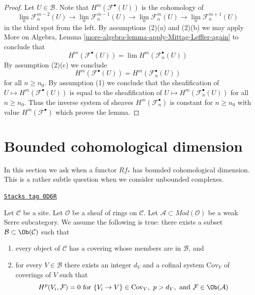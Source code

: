 \begin{proof}
Let $U \in \mathcal{B}$. Note that
$H^m(\mathcal{F}^\bullet(U))$ is the cohomology of
$$
\lim_n \mathcal{F}_n^{m - 2}(U) \to
\lim_n \mathcal{F}_n^{m - 1}(U) \to
\lim_n \mathcal{F}_n^m(U) \to
\lim_n \mathcal{F}_n^{m + 1}(U)
$$
in the third spot from the left. By assumptions (2)(a) and (2)(b)
we may apply
More on Algebra, Lemma \ref{more-algebra-lemma-apply-Mittag-Leffler-again}
to conclude that
$$
H^m(\mathcal{F}^\bullet(U)) = \lim H^m(\mathcal{F}_n^\bullet(U))
$$
By assumption (2)(c) we conclude
$$
H^m(\mathcal{F}^\bullet(U)) = H^m(\mathcal{F}_n^\bullet(U))
$$
for all $n \geq n_0$. By assumption (1) we conclude that the sheafification of
$U \mapsto H^m(\mathcal{F}^\bullet(U))$ is equal to the sheafification
of $U \mapsto H^m(\mathcal{F}_n^\bullet(U))$ for all $n \geq n_0$.
Thus the inverse system of sheaves $H^m(\mathcal{F}_n^\bullet)$ is
constant for $n \geq n_0$ with value $H^m(\mathcal{F}^\bullet)$ which
proves the lemma.
\end{proof}

\section{Bounded cohomological dimension}
\label{sites-cohomology-section-bounded}
In this section we ask when a functor $Rf_*$ has
bounded cohomological dimension. This is a rather subtle question
when we consider unbounded complexes.

\begin{definition}
\label{sites-cohomology-situation-olsson-laszlo}
\href{https://stacks.math.columbia.edu/tag/0D6R}{\texttt{Stacks tag 0D6R}}

Let $\mathcal{C}$ be a site. Let $\mathcal{O}$ be a sheaf of rings on
$\mathcal{C}$. Let $\mathcal{A} \subset \textit{Mod}(\mathcal{O})$
be a weak Serre subcategory. We assume the following is true:
there exists a subset $\mathcal{B} \subset \Ob(\mathcal{C})$ such that
\begin{enumerate}
\item every object of $\mathcal{C}$ has a covering whose
members are in $\mathcal{B}$, and
\item for every $V \in \mathcal{B}$ there exists an integer $d_V$
and a cofinal system $\text{Cov}_V$ of coverings of $V$ such
that
$$
H^p(V_i, \mathcal{F}) = 0 \text{ for }
\{V_i \to V\} \in \text{Cov}_V,\ p > d_V, \text{ and }
\mathcal{F} \in \Ob(\mathcal{A})
$$
\end{enumerate}
\end{definition}

